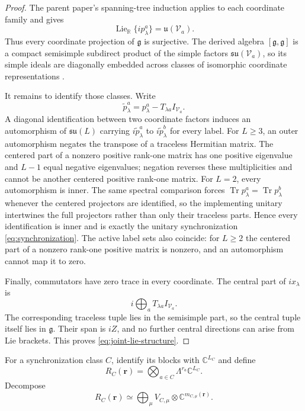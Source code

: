 \documentclass[11pt]{article}
\numberwithin{equation}{section}
\newcommand{\Tr}{\operatorname{Tr}}
\newcommand{\cV}{\mathcal V}
\newcommand{\fg}{\mathfrak g}
\newcommand{\Lie}{\operatorname{Lie}}
\begin{document}
\begin{proof}
The parent paper's spanning-tree induction applies to each coordinate family and gives
\begin{equation}
 \Lie_{\mathbb R}\{ip_\lambda^a\}
 =
 \mathfrak u(\cV_a).
 \label{eq:coordinate-full}
\end{equation}
Thus every coordinate projection of $\fg$ is surjective.  The derived algebra $[\fg,\fg]$ is a compact semisimple subdirect product of the simple factors $\mathfrak{su}(\cV_a)$, so its simple ideals are diagonally embedded across classes of isomorphic coordinate representations \cite{Hall2015}.

It remains to identify those classes.  Write
\begin{equation}
 \widetilde p_\lambda^a
 =
 p_\lambda^a-T_{\lambda a}I_{\cV_a}.
 \label{eq:centered-p}
\end{equation}
A diagonal identification between two coordinate factors induces an automorphism of $\mathfrak{su}(L)$ carrying $i\widetilde p_\lambda^a$ to $i\widetilde p_\lambda^b$ for every label.  For $L\ge3$, an outer automorphism negates the transpose of a traceless Hermitian matrix.  The centered part of a nonzero positive rank-one matrix has one positive eigenvalue and $L-1$ equal negative eigenvalues; negation reverses these multiplicities and cannot be another centered positive rank-one matrix.  For $L=2$, every automorphism is inner.  The same spectral comparison forces $\Tr p_\lambda^a=\Tr p_\lambda^b$ whenever the centered projectors are identified, so the implementing unitary intertwines the full projectors rather than only their traceless parts.  Hence every identification is inner and is exactly the unitary synchronization \eqref{eq:synchronization}.  The active label sets also coincide: for $L\ge2$ the centered part of a nonzero rank-one positive matrix is nonzero, and an automorphism cannot map it to zero.

Finally, commutators have zero trace in every coordinate.  The central part of $ix_\lambda$ is
\begin{equation}
 i\bigoplus_aT_{\lambda a}I_{\cV_a}.
 \label{eq:central-generator}
\end{equation}
The corresponding traceless tuple lies in the semisimple part, so the central tuple itself lies in $\fg$.  Their span is $iZ$, and no further central directions can arise from Lie brackets.  This proves \eqref{eq:joint-lie-structure}.
\end{proof}

For a synchronization class $C$, identify its blocks with $\mathbb C^{L_C}$ and define
\begin{equation}
 R_C(\mathbf r)
 =
 \bigotimes_{a\in C}\Lambda^{r_a}\mathbb C^{L_C}.
 \label{eq:R-C-r}
\end{equation}
Decompose
\begin{equation}
 R_C(\mathbf r)
 \simeq
 \bigoplus_\mu
 V_{C,\mu}\otimes\mathbb C^{m_{C,\mu}(\mathbf r)}.
 \label{eq:RC-decomposition}
\end{equation}
\end{document}
